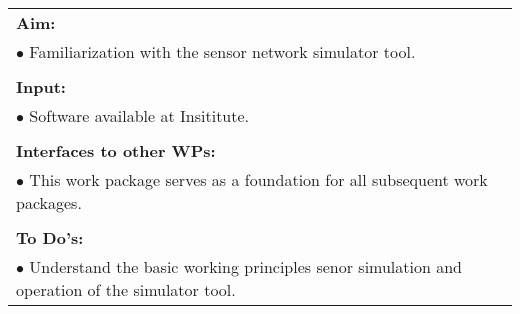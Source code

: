 \begin{table}[!h]
\begin{center}
\begin{tabular}{|p{35mm}||p{55mm}|p{50mm}||p{40mm}|}
      \hline\hline
      \multicolumn{4}{|p{150mm}|}{\textbf{Aim:}}                                                                                                                                                            \\
      \multicolumn{4}{|p{150mm}|}{$\bullet$ Familiarization with the sensor network simulator tool.}                                                   \\
      \multicolumn{4}{|p{150mm}|}{}                                                                                                                                                                           \\
      \multicolumn{4}{|p{150mm}|}{\textbf{Input:}}                                                                                                                                                            \\
      \multicolumn{4}{|p{150mm}|}{$\bullet$ Software available at Insititute.}                                                                                                                                 \\
      \multicolumn{4}{|p{150mm}|}{}                                                                                                                                                                           \\
      \multicolumn{4}{|p{150mm}|}{\textbf{Interfaces to other WPs:}}                                                                                                                                    \\
      \multicolumn{4}{|p{150mm}|}{$\bullet$ This work package serves as a foundation for all subsequent work packages.}                                                                                              \\
      \multicolumn{4}{|p{150mm}|}{}                                                                                                                                                                           \\
      \multicolumn{4}{|p{150mm}|}{\textbf{To Do's:}}                                                                                                                                                         \\
      \multicolumn{4}{|p{150mm}|}{$\bullet$ Understand the basic working principles senor simulation and operation of the simulator tool.}\\

\end{tabular}
\end{center}
\end{table}
